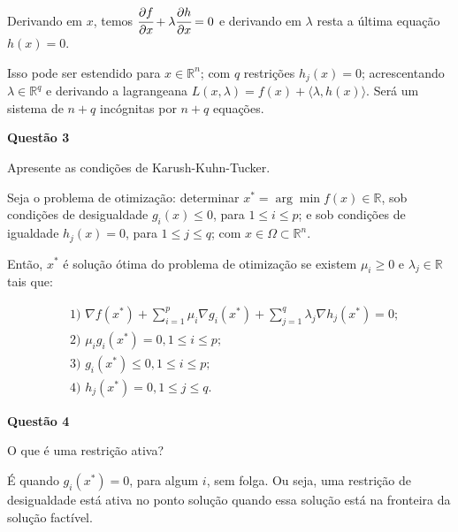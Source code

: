 \documentclass{rbfin}
\begin{document}
Derivando em $x$, temos $\cfrac{\partial f}{\partial x} + \lambda \cfrac{\partial h}{\partial x} = 0$ e derivando em $\lambda$ resta a última equação $h(x) = 0$.

Isso pode ser estendido para $x \in \mathbb{R}^n$; com $q$ restrições $h_j(x) = 0$; acrescentando $\lambda \in \mathbb{R}^q$ e derivando a lagrangeana $L(x, \lambda) = f(x) + \langle \lambda, h(x)\rangle$. Será um sistema de $n + q$ incógnitas por $n + q$ equações.

\singlespacing

\vspace{6mm}

\large

\textbf{Questão 3}

\normalsize

\vspace{6mm}

\doublespacing

Apresente as condições de Karush-Kuhn-Tucker.

Seja o problema de otimização: determinar $x^* = \arg \min f(x) \in \mathbb{R}$, sob condições de desigualdade $g_i(x) \le 0$, para $1 \le i \le p$; e sob condições de igualdade $h_j(x) = 0$, para $1 \le j \le q$; com $x \in \Omega \subset \mathbb{R}^n$.

Então, $x^*$ é solução ótima do problema de otimização se existem $\mu_i \ge 0$ e $\lambda_j \in \mathbb{R}$ tais que:

\begin{align*}
&1)\,\,\nabla f(x^*) + \sum_{i = 1}^p \mu_i \nabla g_i(x^*) + \sum_{j = 1}^q \lambda_j \nabla h_j(x^*) = 0;\\
&2)\,\,\mu_i g_i(x^*) = 0, 1 \le i \le p;\\
&3)\,\,g_i(x^*) \le 0, 1 \le i \le p;\\
&4)\,\,h_j(x^*) = 0, 1 \le j \le q.
\end{align*}

\singlespacing

\vspace{6mm}

\large

\textbf{Questão 4}

\normalsize

\vspace{6mm}

\doublespacing

O que é uma restrição ativa?

É quando $g_i(x^*) = 0$, para algum $i$, sem folga. Ou seja, uma restrição de desigualdade está ativa no ponto solução quando essa solução está na fronteira da solução factível.
\end{document}
